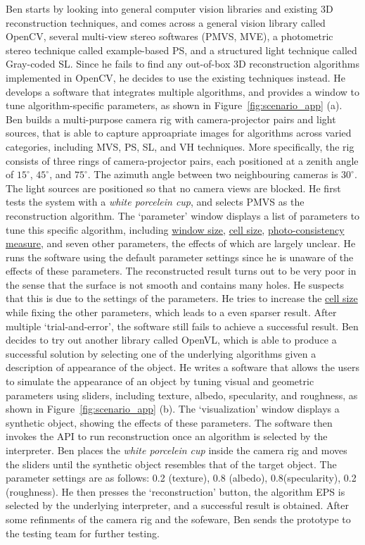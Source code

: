 Ben starts by looking into general computer vision libraries and existing 3D reconstruction techniques, and comes across a general vision library called OpenCV, several multi-view stereo softwares (PMVS, MVE), a photometric stereo technique called example-based PS, and a structured light technique called Gray-coded SL. Since he fails to find any out-of-box 3D reconstruction algorithms implemented in OpenCV, he decides to use the existing techniques instead. He develops a software that integrates multiple algorithms, and provides a window to tune algorithm-specific parameters, as shown in Figure~\ref{fig:scenario_app} (a). Ben builds a multi-purpose camera rig with camera-projector pairs and light sources, that is able to capture approapriate images for algorithms across varied categories, including MVS, PS, SL, and VH techniques. More specifically, the rig consists of three rings of camera-projector pairs, each positioned at a zenith angle of $15^\circ$, $45^\circ$, and $75^\circ$. The azimuth angle between two neighbouring cameras is $30^\circ$. The light sources are positioned so that no camera views are blocked. He first tests the system with a \textit{white porcelein cup}, and selects PMVS as the reconstruction algorithm. The `parameter' window displays a list of parameters to tune this specific algorithm, including \underline{window size}, \underline{cell size}, \underline{photo-consistency measure}, and seven other parameters, the effects of which are largely unclear. He runs the software using the default parameter settings since he is unaware of the effects of these parameters. The reconstructed result turns out to be very poor in the sense that the surface is not smooth and contains many holes. He suspects that this is due to the settings of the parameters. He tries to increase the \underline{cell size} while fixing the other parameters, which leads to a even sparser result. After multiple `trial-and-error', the software still fails to achieve a successful result. Ben decides to try out another library called OpenVL, which is able to produce a successful solution by selecting one of the underlying algorithms given a description of appearance of the object. He writes a software that allows the users to simulate the appearance of an object by tuning visual and geometric parameters using sliders, including texture, albedo, specularity, and roughness, as shown in Figure~\ref{fig:scenario_app} (b). The `visualization' window displays a synthetic object, showing the effects of these parameters. The software then invokes the API to run reconstruction once an algorithm is selected by the interpreter. Ben places the \textit{white porcelein cup} inside the camera rig and moves the sliders until the synthetic object resembles that of the target object. The parameter settings are as follows: 0.2 (texture), 0.8 (albedo), 0.8(specularity), 0.2 (roughness). He then presses the `reconstruction' button, the algorithm EPS is selected by the underlying interpreter, and a successful result is obtained. After some refinments of the camera rig and the sofeware, Ben sends the prototype to the testing team for further testing.

